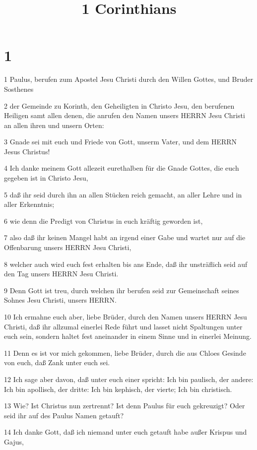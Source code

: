 

\title{1 Corinthians}


\chapter{1}

\par 1 Paulus, berufen zum Apostel Jesu Christi durch den Willen Gottes, und Bruder Sosthenes
\par 2 der Gemeinde zu Korinth, den Geheiligten in Christo Jesu, den berufenen Heiligen samt allen denen, die anrufen den Namen unsers HERRN Jesu Christi an allen ihren und unsern Orten:
\par 3 Gnade sei mit euch und Friede von Gott, unserm Vater, und dem HERRN Jesus Christus!
\par 4 Ich danke meinem Gott allezeit eurethalben für die Gnade Gottes, die euch gegeben ist in Christo Jesu,
\par 5 daß ihr seid durch ihn an allen Stücken reich gemacht, an aller Lehre und in aller Erkenntnis;
\par 6 wie denn die Predigt von Christus in euch kräftig geworden ist,
\par 7 also daß ihr keinen Mangel habt an irgend einer Gabe und wartet nur auf die Offenbarung unsers HERRN Jesu Christi,
\par 8 welcher auch wird euch fest erhalten bis ans Ende, daß ihr unsträflich seid auf den Tag unsers HERRN Jesu Christi.
\par 9 Denn Gott ist treu, durch welchen ihr berufen seid zur Gemeinschaft seines Sohnes Jesu Christi, unsers HERRN.
\par 10 Ich ermahne euch aber, liebe Brüder, durch den Namen unsers HERRN Jesu Christi, daß ihr allzumal einerlei Rede führt und lasset nicht Spaltungen unter euch sein, sondern haltet fest aneinander in einem Sinne und in einerlei Meinung.
\par 11 Denn es ist vor mich gekommen, liebe Brüder, durch die aus Chloes Gesinde von euch, daß Zank unter euch sei.
\par 12 Ich sage aber davon, daß unter euch einer spricht: Ich bin paulisch, der andere: Ich bin apollisch, der dritte: Ich bin kephisch, der vierte; Ich bin christisch.
\par 13 Wie? Ist Christus nun zertrennt? Ist denn Paulus für euch gekreuzigt? Oder seid ihr auf des Paulus Namen getauft?
\par 14 Ich danke Gott, daß ich niemand unter euch getauft habe außer Krispus und Gajus,
